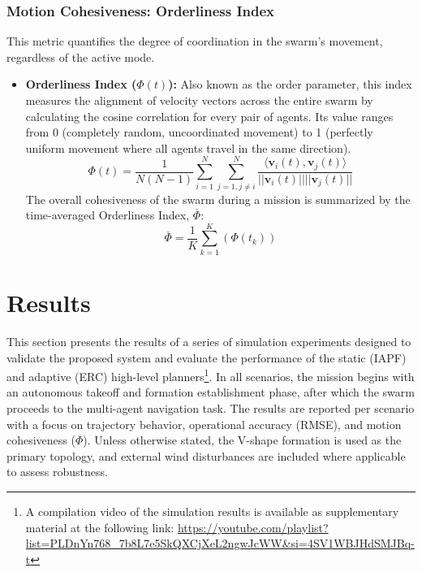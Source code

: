 \documentclass[pdflatex,sn-basic]{sn-jnl}%
\begin{document}
        \subsubsection{Motion Cohesiveness: Orderliness Index}
            This metric quantifies the degree of coordination in the swarm's movement, regardless of the active mode.

            \begin{itemize}
                \item \textbf{Orderliness Index ($\Phi(t)$):} Also known as the order parameter, this index measures the alignment of velocity vectors across the entire swarm by calculating the cosine correlation for every pair of agents. Its value ranges from 0 (completely random, uncoordinated movement) to 1 (perfectly uniform movement where all agents travel in the same direction).
                \begin{equation}
                    \Phi(t)=\frac{1}{N(N-1)}\sum_{i=1}^{N}\sum_{j=1,j\ne i}^{N}\frac{\langle \boldsymbol{v}_{i}(t),\boldsymbol{v}_{j}(t)\rangle}{||\boldsymbol{v}_{i}(t)||||\boldsymbol{v}_{j}(t)||}
                \end{equation}
                The overall cohesiveness of the swarm during a mission is summarized by the time-averaged Orderliness Index, $\overline{\Phi}$:
                \begin{equation}
                    \overline{\Phi}=\frac{1}{K}\sum_{k=1}^{K}(\Phi(t_{k}))
                \end{equation}
            \end{itemize}

\section{Results}
    This section presents the results of a series of simulation experiments designed to validate the proposed system and evaluate the performance of the static (IAPF) and adaptive (ERC) high-level planners\footnote{A compilation video of the simulation results is available as supplementary material at the following link: \url{https://youtube.com/playlist?list=PLDnYn768_7b8L7e5SkQXCjXeL2ngwJcWW&si=4SV1WBJHdSMJBq-t}}. In all scenarios, the mission begins with an autonomous takeoff and formation establishment phase, after which the swarm proceeds to the multi-agent navigation task. The results are reported per scenario with a focus on trajectory behavior, operational accuracy (RMSE), and motion cohesiveness ($\Phi$). Unless otherwise stated, the V-shape formation is used as the primary topology, and external wind disturbances are included where applicable to assess robustness.
\end{document}
